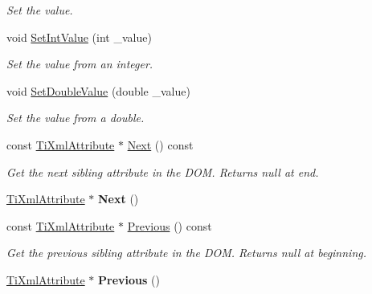 \begin{DoxyCompactItemize}
\begin{DoxyCompactList}\small\item\em Set the value. \end{DoxyCompactList}\item 
\hypertarget{class_ti_xml_attribute_a7e065df640116a62ea4f4b7da5449cc8}{void \hyperlink{class_ti_xml_attribute_a7e065df640116a62ea4f4b7da5449cc8}{Set\+Int\+Value} (int \+\_\+value)}\label{class_ti_xml_attribute_a7e065df640116a62ea4f4b7da5449cc8}

\begin{DoxyCompactList}\small\item\em Set the value from an integer. \end{DoxyCompactList}\item 
\hypertarget{class_ti_xml_attribute_a0316da31373496c4368ad549bf711394}{void \hyperlink{class_ti_xml_attribute_a0316da31373496c4368ad549bf711394}{Set\+Double\+Value} (double \+\_\+value)}\label{class_ti_xml_attribute_a0316da31373496c4368ad549bf711394}

\begin{DoxyCompactList}\small\item\em Set the value from a double. \end{DoxyCompactList}\item 
\hypertarget{class_ti_xml_attribute_a1c78e92e223a40843f644ba48ef69f67}{const \hyperlink{class_ti_xml_attribute}{Ti\+Xml\+Attribute} $\ast$ \hyperlink{class_ti_xml_attribute_a1c78e92e223a40843f644ba48ef69f67}{Next} () const }\label{class_ti_xml_attribute_a1c78e92e223a40843f644ba48ef69f67}

\begin{DoxyCompactList}\small\item\em Get the next sibling attribute in the D\+O\+M. Returns null at end. \end{DoxyCompactList}\item 
\hypertarget{class_ti_xml_attribute_a138320aa7793b148ba7e5bd0a0ea4db6}{\hyperlink{class_ti_xml_attribute}{Ti\+Xml\+Attribute} $\ast$ {\bfseries Next} ()}\label{class_ti_xml_attribute_a138320aa7793b148ba7e5bd0a0ea4db6}

\item 
\hypertarget{class_ti_xml_attribute_a6ebbfe333fe76cd834bd6cbcca3130cf}{const \hyperlink{class_ti_xml_attribute}{Ti\+Xml\+Attribute} $\ast$ \hyperlink{class_ti_xml_attribute_a6ebbfe333fe76cd834bd6cbcca3130cf}{Previous} () const }\label{class_ti_xml_attribute_a6ebbfe333fe76cd834bd6cbcca3130cf}

\begin{DoxyCompactList}\small\item\em Get the previous sibling attribute in the D\+O\+M. Returns null at beginning. \end{DoxyCompactList}\item 
\hypertarget{class_ti_xml_attribute_ae4dabc932cba945ed1e92fec5f121193}{\hyperlink{class_ti_xml_attribute}{Ti\+Xml\+Attribute} $\ast$ {\bfseries Previous} ()}\label{class_ti_xml_attribute_ae4dabc932cba945ed1e92fec5f121193}


\end{DoxyCompactItemize}
